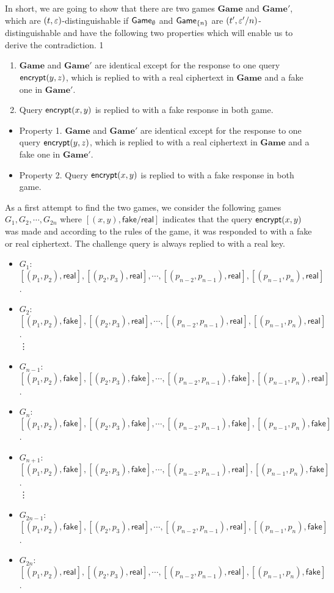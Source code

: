 \documentclass{article}
\newcommand{\encrypt}{{\sf encrypt}}
\newcommand{\game}{{\sf Game}}
\newcommand{\dgame}{{\mathbf{Game}}}
\newcommand{\real}{{\mathsf {real}}}
\newcommand{\fake}{{\mathsf {fake}}}
\def\vaa{0}
\newcommand{\qF}[2]{\left[ (p_{#1},p_{#2}), \fake\right]}
\newcommand{\qR}[2]{\left[ (p_{#1},p_{#2}), \real\right]}
\renewcommand{\labelitemi}{$-$}
\begin{document}
  In short, we are going to show that there are two games $\dgame$ and $\dgame'$, which are $(t,\varepsilon)$-distinguishable if $\game_{\emptyset}$ and $\game_{\cub{n}}$ are $(t',\varepsilon'/n)$-distinguishable and have the following two properties which will enable us to derive the contradiction. 
\if\vaa1
\begin{enumerate}[Property 1.]
 \item $\dgame$ and $\dgame'$ are identical except for the response to one query $\encrypt(y,z)$, which is replied to with a real ciphertext in $\dgame$ and a fake one in $\dgame'$.
 \item Query $\encrypt(x,y)$ is replied to with a fake response in both game.
 \end{enumerate}
 \else
 \renewcommand{\labelitemi}{$\diamond$}
 \begin{itemize}
 \item Property 1. $\dgame$ and $\dgame'$ are identical except for the response to one query $\encrypt(y,z)$, which is replied to with a real ciphertext in $\dgame$ and a fake one in $\dgame'$.
 \item  Property 2. Query $\encrypt(x,y)$ is replied to with a fake response in both game.
\end{itemize}
 \fi
 As a first attempt to find the two games, we consider the following games $G_1, G_2, \cdots, G_{2n}$ where $[(x,y), {\mathsf{fake/real}}]$ indicates that the query $\encrypt(x,y)$ was made and according to the rules of the game, it was responded to with a fake or real ciphertext. The challenge query is always replied to with a real key. 
\renewcommand{\labelitemi}{$-$}
 \begin{itemize}
\item $G_1$:$\qR{1}{2},\qR{2}{3}, \cdots,\qR{n-2}{n-1},\qR{n-1}{n}$.
\item $G_2$:$\qF{1}{2},\qR{2}{3}, \cdots,\qR{n-2}{n-1},\qR{n-1}{n}$.\\
 \vdots
\item $G_{n-1}$:$\qF{1}{2},\qF{2}{3}, \cdots,\qF{n-2}{n-1},\qR{n-1}{n}$.
\item $G_{n}$:$\qF{1}{2},\qF{2}{3}, \cdots,\qF{n-2}{n-1},\qF{n-1}{n}$.
\item $G_{n+1}$:$\qF{1}{2},\qF{2}{3}, \cdots,\qR{n-2}{n-1},\qF{n-1}{n}$.\\
 \vdots
\item $G_{2n-1}$:$\qF{1}{2},\qR{2}{3}, \cdots,\qR{n-2}{n-1},\qF{n-1}{n}$.
\item $G_{2n}$:$\qR{1}{2},\qR{2}{3}, \cdots,\qR{n-2}{n-1},\qF{n-1}{n}$.
 \end{itemize}
\end{document}
